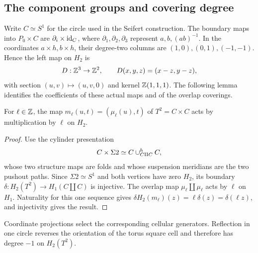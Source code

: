\subsection{The component groups and covering degree}

Write $C\simeq S^1$ for the circle used in the Seifert construction. The boundary maps into $P_0\times C$ are $\partial_i\times\operatorname{id}_C$, where $\partial_1,\partial_2,\partial_3$ represent $a,b,(ab)^{-1}$. In the coordinates $a\times h,b\times h$, their degree-two columns are $(1,0),(0,1),(-1,-1)$. Hence the left map on $H_2$ is
\begin{equation}\label{eq:D}
D:\mathbb Z^3\to\mathbb Z^2,\qquad D(x,y,z)=(x-z,y-z),
\end{equation}
with section $(u,v)\mapsto(u,v,0)$ and kernel $\mathbb Z(1,1,1)$. The following lemma identifies the coefficients of these actual maps and of the overlap coverings.

\begin{lemma}\label{lem:torus-multiplier}
For $\ell\in\mathbb Z$, the map $m_\ell(u,t)=(\mu_\ell(u),t)$ of $T^2=C\times C$ acts by multiplication by $\ell$ on $H_2$.
\end{lemma}
\begin{proof}
Use the cylinder presentation
\[
C\times\Sigma 2\simeq
C\mathbin{\cup}^{h}_{C\amalg C}C,
\]
whose two structure maps are folds and whose suspension meridians are the two pushout paths. Since $\Sigma2\simeq S^1$ and both vertices have zero $H_2$, its boundary $\delta:H_2(T^2)\to H_1(C\amalg C)$ is injective. The overlap map $\mu_\ell\amalg\mu_\ell$ acts by $\ell$ on $H_1$. Naturality for this one sequence gives $\delta H_2(m_\ell)(z)=\ell\delta(z)=\delta(\ell z)$, and injectivity gives the result.
\end{proof}

Coordinate projections select the corresponding cellular generators. Reflection in one circle reverses the orientation of the torus square cell and therefore has degree $-1$ on $H_2(T^2)$.

